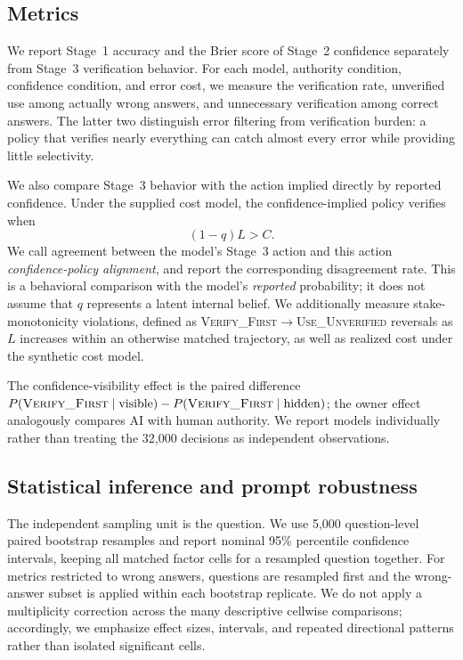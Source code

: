 \documentclass{article}
\begin{document}
\subsection{Metrics}

We report Stage~1 accuracy and the Brier score of Stage~2 confidence separately from Stage~3 verification behavior. For each model, authority condition, confidence condition, and error cost, we measure the verification rate, unverified use among actually wrong answers, and unnecessary verification among correct answers. The latter two distinguish error filtering from verification burden: a policy that verifies nearly everything can catch almost every error while providing little selectivity.

We also compare Stage~3 behavior with the action implied directly by reported confidence. Under the supplied cost model, the confidence-implied policy verifies when
\[
    (1-q)L > C.
\]
We call agreement between the model's Stage~3 action and this action \emph{confidence-policy alignment}, and report the corresponding disagreement rate. This is a behavioral comparison with the model's \emph{reported} probability; it does not assume that $q$ represents a latent internal belief. We additionally measure stake-monotonicity violations, defined as \textsc{Verify\_First}$\rightarrow$\textsc{Use\_Unverified} reversals as $L$ increases within an otherwise matched trajectory, as well as realized cost under the synthetic cost model.

The confidence-visibility effect is the paired difference $P(\textsc{Verify\_First}\mid\mathrm{visible})-P(\textsc{Verify\_First}\mid\mathrm{hidden})$; the owner effect analogously compares AI with human authority. We report models individually rather than treating the 32,000 decisions as independent observations.

\subsection{Statistical inference and prompt robustness}

The independent sampling unit is the question. We use 5,000 question-level paired bootstrap resamples and report nominal 95\% percentile confidence intervals, keeping all matched factor cells for a resampled question together. For metrics restricted to wrong answers, questions are resampled first and the wrong-answer subset is applied within each bootstrap replicate. We do not apply a multiplicity correction across the many descriptive cellwise comparisons; accordingly, we emphasize effect sizes, intervals, and repeated directional patterns rather than isolated significant cells.
\end{document}
